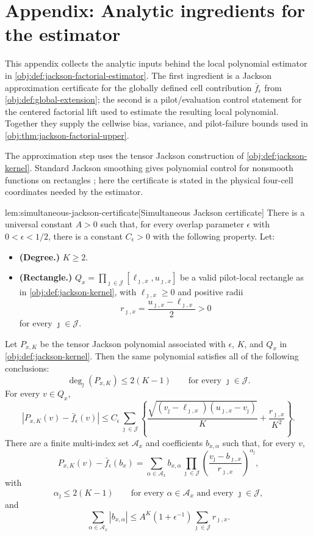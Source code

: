 \section{Appendix: Analytic ingredients for the estimator}

This appendix collects the analytic inputs behind the local polynomial estimator in \cref{obj:def:jackson-factorial-estimator}. The first ingredient is a Jackson approximation certificate for the globally defined cell contribution \(\bar f_\epsilon\) from \cref{obj:def:global-extension}; the second is a pilot/evaluation control statement for the centered factorial lift used to estimate the resulting local polynomial. Together they supply the cellwise bias, variance, and pilot-failure bounds used in \cref{obj:thm:jackson-factorial-upper}.

The approximation step uses the tensor Jackson construction of \cref{obj:def:jackson-kernel}. Standard Jackson smoothing gives polynomial control for nonsmooth functions on rectangles \citep{DeVore1993,JiaoVenkatHanWeissman2015Functionals}; here the certificate is stated in the physical four-cell coordinates needed by the estimator.

\begin{lemmav}{lem:simultaneous-jackson-certificate}[Simultaneous Jackson certificate]
There is a universal constant \(A>0\) such that, for every overlap parameter \(\epsilon\) with \(0<\epsilon<1/2\), there is a constant \(C_\epsilon>0\) with the following property. Let:
\begin{itemize}
\item \textbf{(Degree.)} \(K\ge 2\).
\item \textbf{(Rectangle.)} \(Q_x=\prod_{\jmath\in\mathcal J}[\ell_{\jmath,x},u_{\jmath,x}]\) be a valid pilot-local rectangle as in \cref{obj:def:jackson-kernel}, with \(\ell_{\jmath,x}\ge 0\) and positive radii
\[
r_{\jmath,x}=\frac{u_{\jmath,x}-\ell_{\jmath,x}}{2}>0
\]
for every \(\jmath\in\mathcal J\).
\end{itemize}
Let \(P_{x,K}\) be the tensor Jackson polynomial associated with \(\epsilon\), \(K\), and \(Q_x\) in \cref{obj:def:jackson-kernel}. Then the same polynomial satisfies all of the following conclusions:
\[
\deg_{\jmath}(P_{x,K})\le 2(K-1)
\qquad\text{for every }\jmath\in\mathcal J .
\]
For every \(v\in Q_x\),
\[
\left|P_{x,K}(v)-\bar f_\epsilon(v)\right|
\le
C_\epsilon
\sum_{\jmath\in\mathcal J}
\left\{
\frac{\sqrt{(v_{\jmath}-\ell_{\jmath,x})(u_{\jmath,x}-v_{\jmath})}}{K}
+
\frac{r_{\jmath,x}}{K^2}
\right\}.
\]
There are a finite multi-index set \(\mathcal A_x\) and coefficients \(b_{x,\alpha}\) such that, for every \(v\),
\[
P_{x,K}(v)-\bar f_\epsilon(b_x)
=
\sum_{\alpha\in\mathcal A_x}
b_{x,\alpha}
\prod_{\jmath\in\mathcal J}
\left(\frac{v_{\jmath}-b_{\jmath,x}}{r_{\jmath,x}}\right)^{\alpha_{\jmath}},
\]
with
\[
\alpha_{\jmath}\le 2(K-1)
\qquad\text{for every }\alpha\in\mathcal A_x\text{ and every }\jmath\in\mathcal J,
\]
and
\[
\sum_{\alpha\in\mathcal A_x}|b_{x,\alpha}|
\le
A^K(1+\epsilon^{-1})
\sum_{\jmath\in\mathcal J} r_{\jmath,x}.
\]
\end{lemmav}


